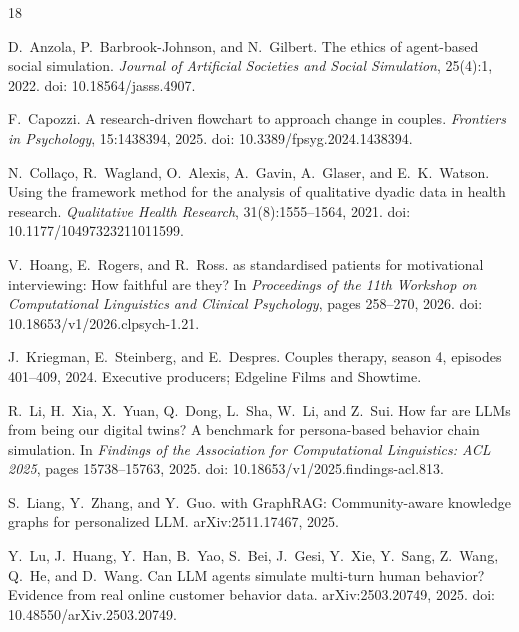 \documentclass{article}
\begin{document}
\begin{thebibliography}{18}

D.~Anzola, P.~Barbrook-Johnson, and N.~Gilbert.
\newblock The ethics of agent-based social simulation.
\newblock \textit{Journal of Artificial Societies and Social Simulation},
  25(4):1, 2022.
\newblock doi: 10.18564/jasss.4907.

F.~Capozzi.
\newblock A research-driven flowchart to approach change in couples.
\newblock \textit{Frontiers in Psychology}, 15:1438394, 2025.
\newblock doi: 10.3389/fpsyg.2024.1438394.

N.~Colla{\c{c}}o, R.~Wagland, O.~Alexis, A.~Gavin, A.~Glaser, and
  E.~K.~Watson.
\newblock Using the framework method for the analysis of qualitative dyadic
  data in health research.
\newblock \textit{Qualitative Health Research}, 31(8):1555--1564, 2021.
\newblock doi: 10.1177/10497323211011599.

V.~Hoang, E.~Rogers, and R.~Ross.
 as standardised patients for motivational interviewing: How
  faithful are they?
\newblock In \textit{Proceedings of the 11th Workshop on Computational
  Linguistics and Clinical Psychology}, pages 258--270, 2026.
\newblock doi: 10.18653/v1/2026.clpsych-1.21.

J.~Kriegman, E.~Steinberg, and E.~Despres.
\newblock Couples therapy, season 4, episodes 401--409, 2024.
\newblock Executive producers; Edgeline Films and Showtime.

R.~Li, H.~Xia, X.~Yuan, Q.~Dong, L.~Sha, W.~Li, and Z.~Sui.
\newblock How far are {LLMs} from being our digital twins? {A} benchmark for
  persona-based behavior chain simulation.
\newblock In \textit{Findings of the Association for Computational
  Linguistics: ACL 2025}, pages 15738--15763, 2025.
\newblock doi: 10.18653/v1/2025.findings-acl.813.

S.~Liang, Y.~Zhang, and Y.~Guo.
 with {GraphRAG}: Community-aware knowledge graphs for
  personalized {LLM}.
\newblock arXiv:2511.17467, 2025.

Y.~Lu, J.~Huang, Y.~Han, B.~Yao, S.~Bei, J.~Gesi, Y.~Xie, Y.~Sang,
  Z.~Wang, Q.~He, and D.~Wang.
\newblock Can {LLM} agents simulate multi-turn human behavior? {E}vidence from
  real online customer behavior data.
\newblock arXiv:2503.20749, 2025.
\newblock doi: 10.48550/arXiv.2503.20749.


\end{thebibliography}
\end{document}
